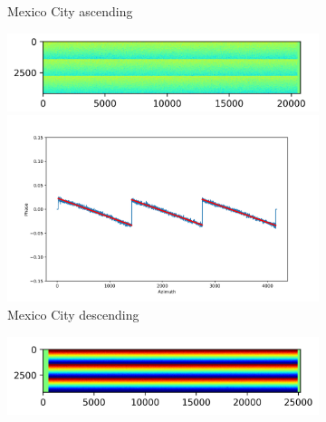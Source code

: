 \documentclass[a4paper,fleqn]{cas-sc}
\begin{document}
\begin{figure}
\begin{subfigure}{0.5\textwidth}
\begin{minipage}{0.5\textwidth}
        \end{minipage}
        \caption{Mexico City ascending}
        \label{fig_5c}
    \end{subfigure}%
    \begin{subfigure}{0.5\textwidth}
        \centering
        \begin{minipage}{0.5\textwidth}
            \centering
            \includegraphics[width=\textwidth]{figure/The cross-interferogram/cross_interf_Mexico_des.png}
        \end{minipage}%
        \begin{minipage}{0.5\textwidth}
            \centering
            \includegraphics[width=\textwidth]{figure/The cross-interferogram/cross_interf_Mexico_des_row&fitted_20230106.png}
        \end{minipage}
        \caption{Mexico City descending}
        \label{fig_5d}
    \end{subfigure}%
    \hfill
    \begin{subfigure}{0.5\textwidth}
        \centering
        \begin{minipage}{0.5\textwidth}
            \centering
            \includegraphics[width=\textwidth]{figure/The cross-interferogram/cross_interf_XiAn_asc.png}

\end{minipage}
\end{subfigure}
\end{figure}
\end{document}
